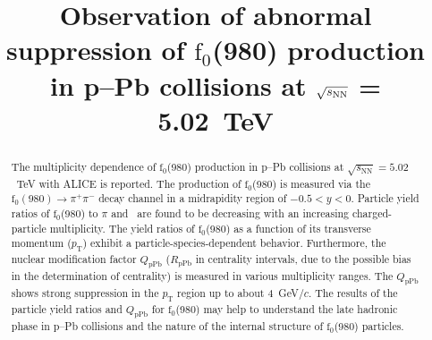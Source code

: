 \documentclass[ALICE,manyauthors]{cernphprep}
\begin{document}
\begin{titlepage}

\PHyear{}
\PHdate{\today}
%

\title{Observation of abnormal suppression of $\mathrm{f}_{0}$(980) production \\in p--Pb collisions at $\sqrt{s_{\rm NN}}$ = 5.02~TeV }

\ShortTitle{}   %


\begin{abstract}
The multiplicity dependence of $\mathrm{f}_{0}$(980) production in p--Pb collisions at $\sqrt{s_{\mathrm{NN}}} = 5.02$~TeV with ALICE is reported. The production of $\mathrm{f}_{0}$(980) is measured via the $\mathrm{f}_0 (980) \rightarrow \pi^{+}\pi^{-}$ decay channel in a midrapidity region of $-0.5<y<0$. Particle yield ratios of $\mathrm{f}_{0}$(980) to $\pi$ and \kstar~are found to be decreasing with an increasing charged-particle multiplicity. The yield ratios of $\mathrm{f}_{0}$(980) as a function of its transverse momentum ($p_{\mathrm{T}}$) exhibit a particle-species-dependent behavior. Furthermore, the nuclear modification factor $Q_{\mbox{pPb}}$ ($R_{\mbox{pPb}}$ in centrality intervals, due to the possible bias in the determination of centrality) is measured in various multiplicity ranges. The $Q_{\mbox{pPb}}$ shows strong suppression in the  $p_{\mathrm{T}}$ region up to about 4~GeV/$c$. The results of the particle yield ratios and $Q_{\mbox{pPb}}$ for $\mathrm{f}_{0}$(980) may help to understand the late hadronic phase in p--Pb collisions and the nature of the internal structure of $\mathrm{f}_{0}$(980) particles.



\color{black}

\end{abstract}
 
\end{titlepage}

\setcounter{page}{2}





\end{document}
